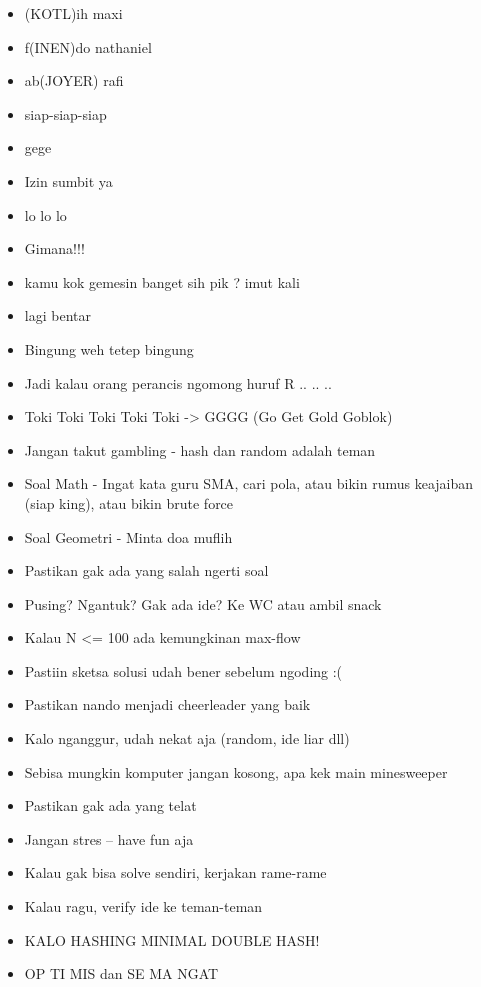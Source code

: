 \begin{itemize}
  \item (KOTL)ih maxi
  \item f(INEN)do nathaniel
  \item ab(JOYER) rafi
  \item siap-siap-siap
  \item gege
  \item Izin sumbit ya
  \item lo lo lo
  \item Gimana!!!
  \item kamu kok gemesin banget sih pik ? imut kali
  \item lagi bentar
  \item Bingung weh tetep bingung
  \item Jadi kalau orang perancis ngomong huruf R .. .. ..
  \item Toki Toki Toki Toki Toki -> GGGG (Go Get Gold Goblok)
  \item Jangan takut gambling - hash dan random adalah teman
  \item Soal Math - Ingat kata guru SMA, cari pola, atau bikin rumus keajaiban (siap king), atau bikin brute force
  \item Soal Geometri - Minta doa muflih
  \item Pastikan gak ada yang salah ngerti soal 
  \item Pusing? Ngantuk? Gak ada ide? Ke WC atau ambil snack
  \item Kalau N <= 100 ada kemungkinan max-flow
  \item Pastiin sketsa solusi udah bener sebelum ngoding :(
  \item Pastikan nando menjadi cheerleader yang baik
  \item Kalo nganggur, udah nekat aja (random, ide liar dll)
  \item Sebisa mungkin komputer jangan kosong, apa kek main minesweeper
  \item Pastikan gak ada yang telat
  \item Jangan stres -- have fun aja
  \item Kalau gak bisa solve sendiri, kerjakan rame-rame
  \item Kalau ragu, verify ide ke teman-teman
  \item KALO HASHING MINIMAL DOUBLE HASH!
  \item OP TI MIS dan SE MA NGAT
\end{itemize}
